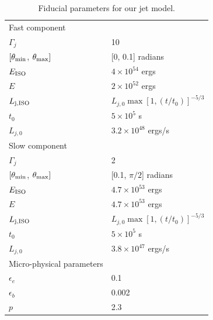 \documentclass[usenatbib,fleqn]{mnras}
\begin{document}
\begin{table}
\begin{threeparttable}
  \caption{\label{tab:jetParams}Fiducial parameters for our jet
    model.}
  \begin{tabular}{ll}
    \hline
    Fast component\\ 
    $\Gamma_j$ & 10 \\
    $[\theta_{\rm min}$, $\theta_{\rm max}]$ & [0, 0.1] radians \\
    $E_{\rm ISO}$ & $4 \times 10^{54}$ ergs \\
    $E$ & $2 \times 10^{52}$ ergs\\
    $L_{\rm j,ISO}$ & $L_{j,0} \max\left[1, (t/t_0)\right]^{-5/3}$  \\
    $t_0$ & $5\times 10^5$ s\\
    $L_{j,0}$ & $3.2 \times 10^{48}$ ergs/s\\
    \hline 
    Slow component\\
    $\Gamma_j$ & 2 \\
    $[\theta_{\rm min}$, $\theta_{\rm max}]$ & [0.1, $\pi/2$] radians \\
    $E_{\rm ISO}$ & $4.7 \times 10^{53}$ ergs \\
    $E$ & $4.7 \times 10^{53}$ ergs\\
    $L_{\rm j, ISO}$ & $L_{j,0} \max\left[1, (t/t_0)\right]^{-5/3}$  \\
    $t_0$ & $5\times 10^5$ s\\
    $L_{j,0}$ & $3.8 \times 10^{47}$ ergs/s\\
    \hline
    Micro-physical parameters\\
    $\epsilon_e$ & 0.1\\
    $\epsilon_b$ & 0.002\\
    $p$ & 2.3\\
  \end{tabular}
\end{threeparttable}
\end{table}
\end{document}
